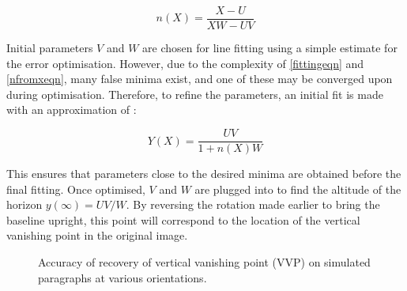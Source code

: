 \begin{equation}
n(X) = \frac{X-U}{XW-UV}
\label{nfromxeqn}
\end{equation}

Initial parameters $V$ and $W$ are chosen for line fitting using a simple estimate for the error optimisation.
However, due to the complexity of \ref{fittingeqn} and \ref{nfromxeqn}, many false minima exist, and one of these may be converged upon during optimisation.
Therefore, to refine the parameters, an initial fit is made with an approximation of :

\begin{equation}
Y(X) = \frac{ UV }{ 1+n(X)W }
\end{equation}

This ensures that parameters close to the desired minima are obtained before the final fitting.  Once optimised, $V$ and $W$ are plugged into  to find the altitude of the horizon $y(\infty) = UV/W$.
By reversing the rotation made earlier to bring the baseline upright, this point will correspond to the location of the vertical vanishing point in the original image.

\begin{figure}[t]
\begin{centering}
	\hspace{2mm}
\caption{Accuracy of recovery of vertical vanishing point (VVP) on simulated paragraphs at various orientations.}
\label{vvpaccuracy}
\end{centering}
\end{figure}

